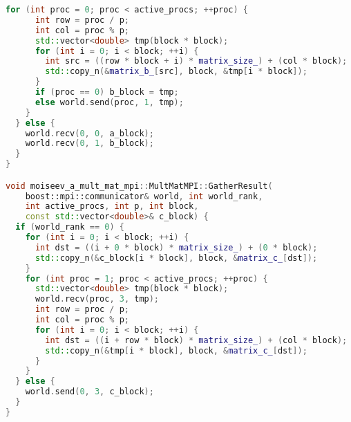 \documentclass[14pt,a4paper]{extarticle}
\begin{document}
\begin{lstlisting}[frame=single,language=C++,basicstyle=\small]
    for (int proc = 0; proc < active_procs; ++proc) {
      int row = proc / p;
      int col = proc % p;
      std::vector<double> tmp(block * block);
      for (int i = 0; i < block; ++i) {
        int src = ((row * block + i) * matrix_size_) + (col * block);
        std::copy_n(&matrix_b_[src], block, &tmp[i * block]);
      }
      if (proc == 0) b_block = tmp;
      else world.send(proc, 1, tmp);
    }
  } else {
    world.recv(0, 0, a_block);
    world.recv(0, 1, b_block);
  }
}

void moiseev_a_mult_mat_mpi::MultMatMPI::GatherResult(
    boost::mpi::communicator& world, int world_rank, 
    int active_procs, int p, int block, 
    const std::vector<double>& c_block) {
  if (world_rank == 0) {
    for (int i = 0; i < block; ++i) {
      int dst = ((i + 0 * block) * matrix_size_) + (0 * block);
      std::copy_n(&c_block[i * block], block, &matrix_c_[dst]);
    }
    for (int proc = 1; proc < active_procs; ++proc) {
      std::vector<double> tmp(block * block);
      world.recv(proc, 3, tmp);
      int row = proc / p;
      int col = proc % p;
      for (int i = 0; i < block; ++i) {
        int dst = ((i + row * block) * matrix_size_) + (col * block);
        std::copy_n(&tmp[i * block], block, &matrix_c_[dst]);
      }
    }
  } else {
    world.send(0, 3, c_block);
  }
}
\end{lstlisting}
\end{document}

